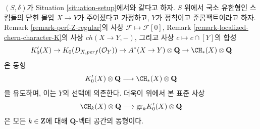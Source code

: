 \begin{proposition}
\label{proposition-K-tensor-Q}
$(S, \delta)$가 Situation \ref{situation-setup}에서와 같다고 하자.
$S$ 위에서 국소 유한형인 스킴들의 닫힌 몰입 $X \to Y$가 주어졌다고
가정하고, $Y$가 정칙이고 준콤팩트이라고 하자. Remark
\ref{remark-perf-Z-regular}의 사상 $\mathcal{F} \mapsto \mathcal{F}[0]$,
Remark \ref{remark-localized-chern-character-K}의 사상
$ch(X \to Y, -)$, 그리고 사상 $c \mapsto c \cap [Y]$의 합성
$$
K'_0(X) \to
K_0(D_{X, perf}(\mathcal{O}_Y)) \to
A^*(X \to Y) \otimes \mathbf{Q} \to
\CH_*(X) \otimes \mathbf{Q}
$$
은 동형
$$
K'_0(X) \otimes \mathbf{Q}
\longrightarrow
\CH_*(X) \otimes \mathbf{Q}
$$
을 유도하며, 이는 $Y$의 선택에 의존한다. 더욱이 위에서 본 표준 사상
$$
\CH_k(X) \otimes \mathbf{Q}
\longrightarrow
\text{gr}_k K'_0(X) \otimes \mathbf{Q}
$$
은 모든 $k \in \mathbf{Z}$에 대해 $\mathbf{Q}$-벡터 공간의
동형이다.
\end{proposition}

